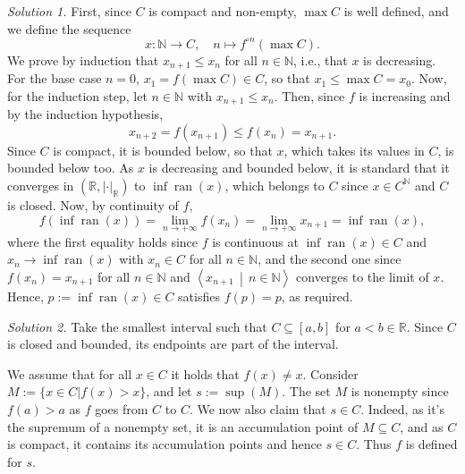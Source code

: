 \begin{solution}
    \textit{Solution 1.}
    First, since \( C \) is compact and non-empty, \( \max C \) is well defined, and we define the sequence
    \[
        x \colon \mathbb{N} \longrightarrow C, \quad n \longmapsto f^{\circ n}\left(\max C\right).
    \]
    We prove by induction that \( x_{n+1} \leq x_n \) for all \( n \in \mathbb{N} \), i.e., that \( x \) is decreasing. For the base case \( n = 0 \), \( x_1 = f\left(\max C\right) \in C \), so that \( x_1 \leq \max C = x_0 \). Now, for the induction step, let \( n \in \mathbb{N} \) with \( x_{n+1} \leq x_n \). Then, since \( f \) is increasing and by the induction hypothesis,
    \[
        x_{n+2} = f\left(x_{n+1}\right) \leq f\left(x_n\right) = x_{n+1}.
    \]
    Since \( C \) is compact, it is bounded below, so that \( x \), which takes its values in \( C \), is bounded below too. As \( x \) is decreasing and bounded below, it is standard that it converges in \( \left(\mathbb{R},\left|\cdot\right|_{\mathbb{R}}\right) \) to \( \inf \operatorname{ran}\left(x\right) \), which belongs to \( C \) since \( x \in C^{\mathbb{N}} \) and \( C \) is closed. Now, by continuity of \( f \),
    \[
        f\left(\inf \operatorname{ran}\left(x\right)\right) = \lim_{n \to +\infty} f\left(x_n\right) = \lim_{n \to +\infty} x_{n+1} = \inf \operatorname{ran}\left(x\right),
    \]
    where the first equality holds since \( f \) is continuous at \( \inf \operatorname{ran}\left(x\right) \in C \) and \( x_n \to \inf \operatorname{ran}\left(x\right) \) with \( x_n \in C \) for all \( n \in \mathbb{N} \), and the second one since \( f\left(x_n\right) = x_{n+1} \) for all \( n \in \mathbb{N} \) and \( \left\langle x_{n+1} \,\middle|\, n \in \mathbb{N} \right\rangle \) converges to the limit of \( x \). Hence, \( p := \inf \operatorname{ran}\left(x\right) \in C \) satisfies \( f\left(p\right) = p \), as required.

    \textit{Solution 2.}
    Take the smallest interval such that \( C \subseteq [a,b] \) for \( a<b \in \mathbb{R} \). Since \( C \) is closed and bounded, its endpoints are part of the interval. \newline

    We assume that for all \( x\in C \) it holds that \( f(x)\neq x \). Consider \( M := \{x \in C | f(x) > x\} \), and let \( s := \sup (M) \). The set \( M \) is nonempty since \( f(a)>a \) as \( f \) goes from \( C \) to \( C \). We now also claim that \( s \in C \). Indeed, as it's the supremum of a nonempty set, it is an accumulation point of \( M \subseteq C \), and as \( C \) is compact, it contains its accumulation points and hence \( s \in C \). Thus \( f \) is defined for \( s \). \newline


\end{solution}
